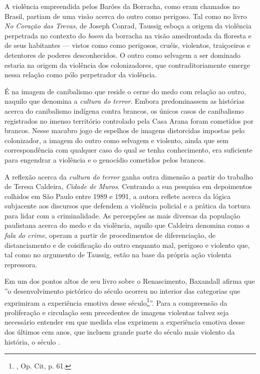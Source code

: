 A violência empreendida pelos Barões da Borracha, como eram chamados no
Brasil, partiam de uma visão acerca do outro como perigoso. Tal como no
livro \emph{No Coração das Trevas}, de Joseph Conrad, Taussig esboça a
origem da violência perpetrada no contexto do \emph{boom} da borracha na
visão amedrontada da floresta e de seus habitantes --- vistos como como
perigosos, cruéis, violentos, traiçoeiros e detentores de poderes
desconhecidos. O outro como selvagem a ser dominado estaria na origem da
violência dos colonizadores, que contraditoriamente emerge nessa relação
como pólo perpetrador da violência.

É na imagem de canibalismo que reside o cerne do medo com relação ao
outro, naquilo que denomina a \emph{cultura do terror}. Embora
predominassem as histórias acerca do canibalismo indígena contra
brancos, os únicos casos de canibalismo registrados no imenso território
controlado pela Casa Arana foram cometidos por brancos. Nesse macabro
jogo de espelhos de imagens distorcidas impostas pelo colonizador, a
imagem do outro como selvagem e violento, ainda que sem correspondência
com qualquer caso do qual se tenha conhecimento, era suficiente para
engendrar a violência e o genocídio cometidos pelos brancos.

A reflexão acerca da \emph{cultura do terror} ganha outra dimensão a
partir do trabalho de Teresa Caldeira, \emph{Cidade de Muros}. Centrando
a sua pesquisa em depoimentos colhidos em São Paulo entre 1989 e 1991, a
autora reflete acerca da lógica subjacente aos discursos que defendem a
violência policial e a prática da tortura para lidar com a
criminalidade. As percepções as mais diversas da população paulistana
acerca do medo e da violência, aquilo que Caldeira denomina como \emph{a
fala do crime}, operam a partir de procedimentos de diferenciação, de
distanciamento e de coisificação do outro enquanto mal, perigoso e
violento que, tal como no argumento de Taussig, estão na base da própria
ação violenta repressora.

\asterisc

Em um dos pontos altos de seu livro sobre o Renascimento, Baxandall
afirma que ''o desenvolvimento pictórico do século  ocorreu no
interior das categorias que exprimiram a experiência emotiva desse
século\footnote{, Op. Cit, p. 61.}''. Para a compreensão da
proliferação e circulação sem precedentes de imagens violentas talvez
seja necessário entender em que medida elas exprimem a experiência
emotiva desse dos últimos cem anos, que incluem grande parte do século
mais violento da história, o século .

